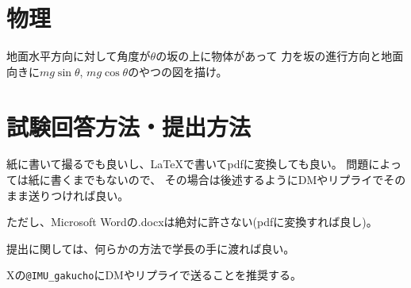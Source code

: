 \documentclass{ltjsarticle}
\begin{document}
\section{物理}
地面水平方向に対して角度が$\theta$の坂の上に物体があって
力を坂の進行方向と地面向きに$mg\sin\theta$, $mg\cos\theta$のやつの図を描け。

\section*{試験回答方法・提出方法}

紙に書いて撮るでも良いし、\LaTeX で書いてpdfに変換しても良い。
問題によっては紙に書くまでもないので、
その場合は後述するようにDMやリプライでそのまま送りつければ良い。

ただし、Microsoft Wordの.docxは絶対に許さない(pdfに変換すれば良し)。

提出に関しては、何らかの方法で学長の手に渡れば良い。

Xの\texttt{@IMU\_gakucho}にDMやリプライで送ることを推奨する。
\end{document}
